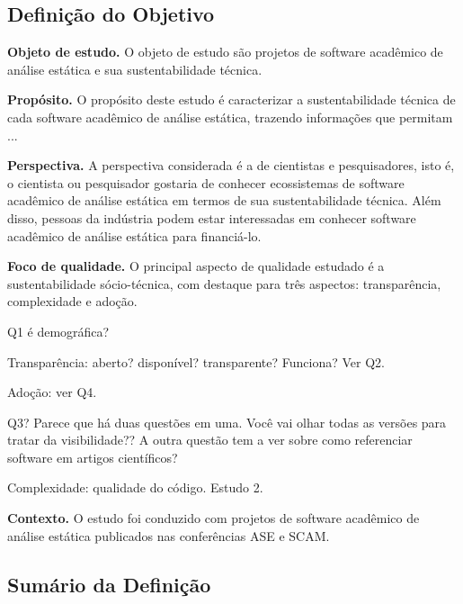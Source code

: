 \subsection{Definição do Objetivo}

\begin{description}
\item{\bf Objeto de estudo.} 
O objeto de estudo são projetos de software acadêmico de análise estática e sua sustentabilidade técnica.

\item{\bf Propósito.} 
O propósito deste estudo é caracterizar a sustentabilidade técnica de cada software acadêmico de análise estática,
trazendo informações que permitam ...

\item{\bf Perspectiva.} 
A perspectiva considerada é a de cientistas e pesquisadores, isto é, 
o cientista ou pesquisador gostaria de conhecer ecossistemas de software acadêmico de análise estática
em termos de sua sustentabilidade técnica. 
Além disso, pessoas da indústria podem estar interessadas em conhecer
software acadêmico de análise estática para financiá-lo.

\item{\bf Foco de qualidade.} 
O principal aspecto de qualidade estudado é a sustentabilidade sócio-técnica,
com destaque para três aspectos: transparência, complexidade e adoção.


Q1 é demográfica?

Transparência: aberto? disponível? transparente?  Funciona? Ver Q2.

Adoção: ver Q4.

Q3? Parece que há duas questões em uma. Você vai olhar todas as versões para tratar da visibilidade??
A outra questão tem a ver sobre como referenciar software em artigos científicos?

Complexidade: qualidade do código.  Estudo 2.

\item{\bf Contexto.} 
O estudo foi conduzido com projetos de software acadêmico de análise estática
publicados nas conferências ASE e SCAM.
\end{description}

\subsection{Sumário da Definição}



